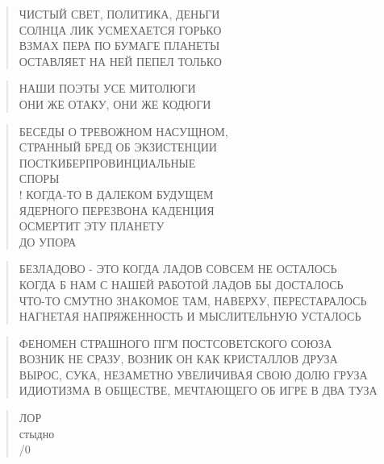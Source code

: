 \poemtitle{***}
\begin{verse}
ЧИСТЫЙ СВЕТ, ПОЛИТИКА, ДЕНЬГИ\\
СОЛНЦА ЛИК УСМЕХАЕТСЯ ГОРЬКО\\
ВЗМАХ ПЕРА ПО БУМАГЕ ПЛАНЕТЫ\\
ОСТАВЛЯЕТ НА НЕЙ ПЕПЕЛ ТОЛЬКО
\end{verse}

\poemtitle{***}
\begin{verse}
НАШИ ПОЭТЫ УСЕ МИТОЛЮГИ\\
ОНИ ЖЕ ОТАКУ, ОНИ ЖЕ КОДЮГИ
\end{verse}

\poemtitle{***}
\begin{verse}
БЕСЕДЫ О ТРЕВОЖНОМ НАСУЩНОМ, \\
                  СТРАННЫЙ БРЕД ОБ ЭКЗИСТЕНЦИИ\\
ПОСТКИБЕРПРОВИНЦИАЛЬНЫЕ \\
                  СПОРЫ\\!
КОГДА-ТО В ДАЛЕКОМ БУДУЩЕМ\\
                  ЯДЕРНОГО ПЕРЕЗВОНА КАДЕНЦИЯ\\
ОСМЕРТИТ ЭТУ ПЛАНЕТУ \\
                  ДО УПОРА
\end{verse}

\poemtitle{***}
\begin{verse}
БЕЗЛАДОВО - ЭТО КОГДА ЛАДОВ СОВСЕМ НЕ ОСТАЛОСЬ\\
КОГДА Б НАМ С НАШЕЙ РАБОТОЙ ЛАДОВ БЫ ДОСТАЛОСЬ\\
ЧТО-ТО СМУТНО ЗНАКОМОЕ ТАМ, НАВЕРХУ, ПЕРЕСТАРАЛОСЬ\\
НАГНЕТАЯ НАПРЯЖЕННОСТЬ И МЫСЛИТЕЛЬНУЮ УСТАЛОСЬ
\end{verse}

\poemtitle{***}
\begin{verse}
ФЕНОМЕН СТРАШНОГО ПГМ ПОСТСОВЕТСКОГО СОЮЗА\\
ВОЗНИК НЕ СРАЗУ, ВОЗНИК ОН КАК КРИСТАЛЛОВ ДРУЗА\\
ВЫРОС, СУКА, НЕЗАМЕТНО УВЕЛИЧИВАЯ СВОЮ ДОЛЮ ГРУЗА\\
ИДИОТИЗМА В ОБЩЕСТВЕ, МЕЧТАЮЩЕГО ОБ ИГРЕ В ДВА ТУЗА
\end{verse}

\poemtitle{***}
\begin{verse}
ЛОР\\
стыдно\\
/0
\end{verse}

